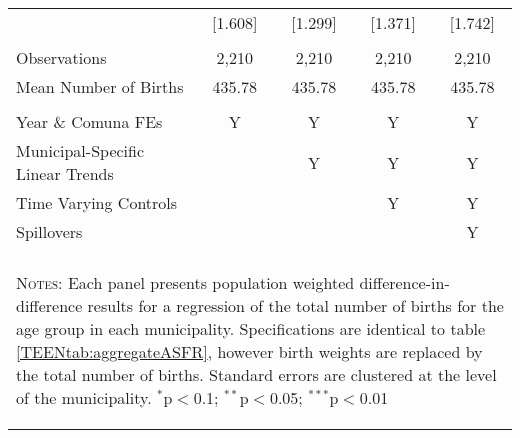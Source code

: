 \begin{table}[!htbp]
\begin{tabular}{@{\extracolsep{5pt}}lcccc}
            &[1.608]&[1.299]&[1.371]&[1.742]\\
 & & & & \\
Observations&2,210&2,210&2,210&2,210\\
Mean Number of Births&435.78&435.78&435.78&435.78\\
\hline \\[-1.8ex] 
{\small Year \& Comuna FEs}             &Y&Y&Y&Y \\
{\small Municipal-Specific Linear Trends}& &Y&Y&Y \\
{\small Time Varying Controls}           & & &Y&Y \\
{\small Spillovers}                      & & & &Y \\
\hline \hline \\[-1.8ex]
\multicolumn{5}{p{14.2cm}}{\begin{footnotesize}
\textsc{Notes:} Each panel presents population       
weighted difference-in-difference results for a       
regression of the total number of births for the age  
group in each municipality. Specifications are        
identical to table \ref{TEENtab:aggregateASFR},      
however birth weights are replaced by the total number
 of births. Standard errors are clustered             
at the level of the municipality.
$^{*}$p$<$0.1; $^{**}$p$<$0.05; $^{***}$p$<$0.01\end{footnotesize}}
\normalsize\end{tabular}\end{table}
